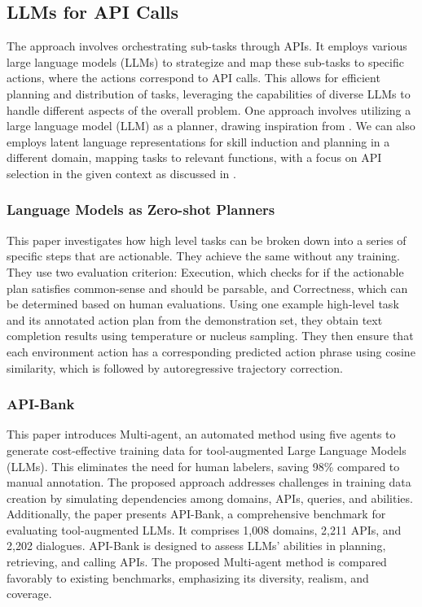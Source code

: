 \documentclass[10pt,twocolumn,letterpaper]{article}
\begin{document}
\subsection{LLMs for API Calls}
The approach involves orchestrating sub-tasks through APIs. It employs various large language models (LLMs) to strategize and map these sub-tasks to specific actions, where the actions correspond to API calls. This allows for efficient planning and distribution of tasks, leveraging the capabilities of diverse LLMs to handle different aspects of the overall problem. One approach involves utilizing a large language model (LLM) as a planner, drawing inspiration from \cite{shen2023hugginggpt}. We can also employs latent language representations for skill induction and planning in a different domain, mapping tasks to relevant functions, with a focus on API selection in the given context as discussed in \cite{sharma2022skill}.
\subsubsection{Language Models as Zero-shot Planners\cite{huang2022language}} This paper investigates how high level tasks can be broken down into a series of specific steps that are actionable. They achieve the same without any training. They use two evaluation criterion: Execution, which checks for if the actionable plan satisfies common-sense and should be parsable, and Correctness, which can be determined based on human evaluations. Using one example high-level task and its annotated action plan from the demonstration set, they obtain text completion results using temperature or nucleus sampling. They then ensure that each environment action has a corresponding predicted action phrase using cosine similarity, which is followed by autoregressive trajectory correction.

\subsubsection{API-Bank \cite{li2023apibank} } This paper introduces Multi-agent, an automated method using five agents to generate cost-effective training data for tool-augmented Large Language Models (LLMs). This eliminates the need for human labelers, saving 98\% compared to manual annotation. The proposed approach addresses challenges in training data creation by simulating dependencies among domains, APIs, queries, and abilities. Additionally, the paper presents API-Bank, a comprehensive benchmark for evaluating tool-augmented LLMs. It comprises 1,008 domains, 2,211 APIs, and 2,202 dialogues. API-Bank is designed to assess LLMs' abilities in planning, retrieving, and calling APIs. The proposed Multi-agent method is compared favorably to existing benchmarks, emphasizing its diversity, realism, and coverage.
\end{document}
